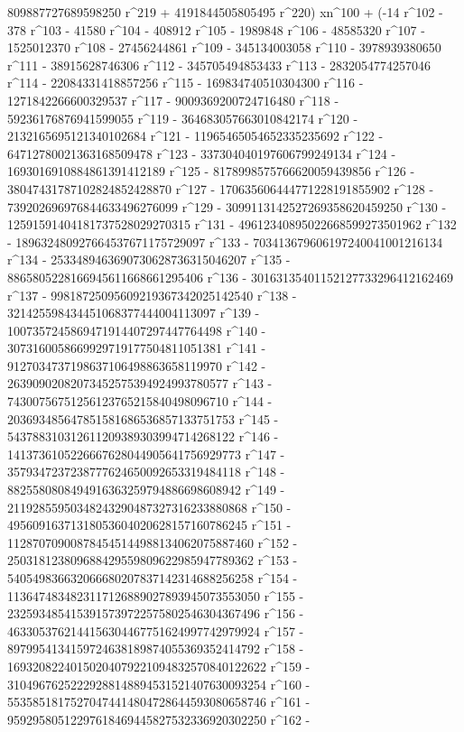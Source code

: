        809887727689598250 r^219 + 
       4191844505805495 r^220) xn^100 + (-14 r^102 - 378 r^103 - 
       41580 r^104 - 408912 r^105 - 1989848 r^106 - 48585320 r^107 - 
       1525012370 r^108 - 27456244861 r^109 - 345134003058 r^110 - 
       3978939380650 r^111 - 38915628746306 r^112 - 
       345705494853433 r^113 - 2832054774257046 r^114 - 
       22084331418857256 r^115 - 169834740510304300 r^116 - 
       1271842266600329537 r^117 - 9009369200724716480 r^118 - 
       59236176876941599055 r^119 - 364683057663010842174 r^120 - 
       2132165695121340102684 r^121 - 11965465054652335235692 r^122 - 
       64712780021363168509478 r^123 - 
       337304040197606799249134 r^124 - 
       1693016910884861391412189 r^125 - 
       8178998575766620059439856 r^126 - 
       38047431787102824852428870 r^127 - 
       170635606444771228191855902 r^128 - 
       739202696976844633496276099 r^129 - 
       3099113142527269358620459250 r^130 - 
       12591591404181737528029270315 r^131 - 
       49612340895022668599273501962 r^132 - 
       189632480927664537671175729097 r^133 - 
       703413679606197240041001216134 r^134 - 
       2533489463690730628736315046207 r^135 - 
       8865805228166945611668661295406 r^136 - 
       30163135401152127733296412162469 r^137 - 
       99818725095609219367342025142540 r^138 - 
       321425598434451068377444004113097 r^139 - 
       1007357245869471914407297447764498 r^140 - 
       3073160058669929719177504811051381 r^141 - 
       9127034737198637106498863658119970 r^142 - 
       26390902082073452575394924993780577 r^143 - 
       74300756751256123765215840498096710 r^144 - 
       203693485647851581686536857133751753 r^145 - 
       543788310312611209389303994714268122 r^146 - 
       1413736105226667628044905641756929773 r^147 - 
       3579347237238777624650092653319484118 r^148 - 
       8825580808494916363259794886698608942 r^149 - 
       21192855950348243290487327316233880868 r^150 - 
       49560916371318053604020628157160786245 r^151 - 
       112870709008784545144988134062075887460 r^152 - 
       250318123809688429559809622985947789362 r^153 - 
       540549836632066680207837142314688256258 r^154 - 
       1136474834823117126889027893945073553050 r^155 - 
       2325934854153915739722575802546304367496 r^156 - 
       4633053762144156304467751624997742979924 r^157 - 
       8979954134159724638189874055369352414792 r^158 - 
       16932082240150204079221094832570840122622 r^159 - 
       31049676252229288148894531521407630093254 r^160 - 
       55358518175270474414804728644593080658746 r^161 - 
       95929580512297618469445827532336920302250 r^162 - 

